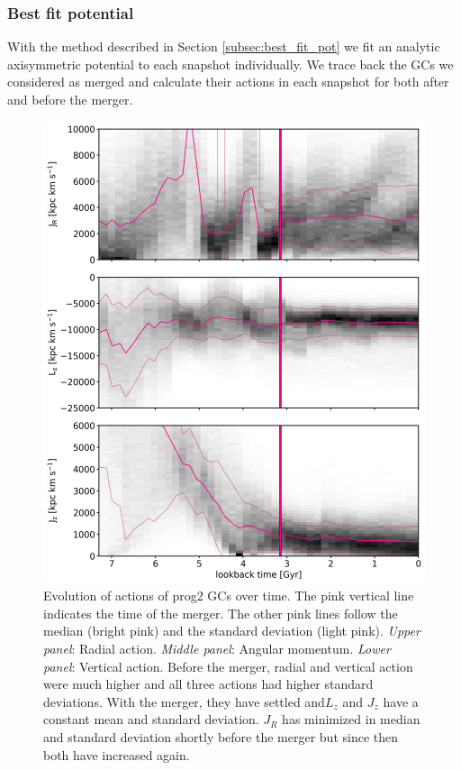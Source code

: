 \subsubsection{Best fit potential}\label{subsubsec:GCs_action_time_right_pot}
With the method described in Section \ref{subsec:best_fit_pot} we fit an analytic axisymmetric potential to each snapshot individually. We trace back the \acp{GC} we considered as merged and calculate their actions in each snapshot for both after and before the merger. 
\begin{figure}[htbp]
\captionsetup{format=plain}
    \centering
	\includegraphics[width=\textwidth]{plots/Dynamics/prog2/action_time_evolution_hist_mean_prog2.png}

	\caption{Evolution of actions of prog2 \acp{GC} over time. The pink vertical line indicates the time of the merger. The other pink lines follow the median (bright pink) and the standard deviation (light pink). \textit{Upper panel}: Radial action. \textit{Middle panel}: Angular momentum. \textit{Lower panel}: Vertical action. Before the merger, radial and vertical action were much higher and all three actions had higher standard deviations. With the merger, they have settled and$L_z$ and $J_z$ have a constant mean and standard deviation. $J_R$ has minimized in median and standard deviation shortly before the merger but since then both have increased again.}\label{fig:actions_time_evolution_prog2}
\end{figure}

